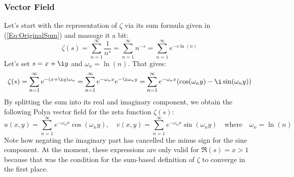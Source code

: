 \documentclass[12pt]{article}
\begin{document}
\subsubsection{Vector Field}
Let's start with the representation of $\zeta$ via its sum formula given in (\ref{Eq:OriginalSum}) and massage it a bit:
\begin{equation}
\zeta(s)
= \sum_{n=1}^{\infty} \frac{1}{n^s}
= \sum_{n=1}^{\infty} n^{-s}
= \sum_{n=1}^{\infty} e^{-s \ln(n)}
\end{equation}
Let's set $s = x + \i y$ and $\omega_n = \ln(n)$. That gives:
\begin{equation}
\zeta(s)
= \sum_{n=1}^{\infty} e^{-(x + \i y) \omega_n}
= \sum_{n=1}^{\infty} e^{-\omega_n x} e^{-\i \omega_n y}
= \sum_{n=1}^{\infty} e^{-\omega_n x} (\cos(\omega_n y) - \i \sin (\omega_n y))
\end{equation}
 By splitting the sum into its real and imaginary component, we obtain the following Polya vector field for the zeta function $\zeta(s)$:
\begin{equation}
\label{Eq:PolyaFieldOriginal}	
\boxed{
u(x,y) = \sum_{n=1}^{\infty} e^{-\omega_n x} \cos(\omega_n y), \quad
v(x,y) = \sum_{n=1}^{\infty} e^{-\omega_n x} \sin(\omega_n y) 
}
\quad \text{where} \quad \omega_n = \ln(n) 
\end{equation}
Note how negating the imaginary part has cancelled the minus sign for the sine component. At the moment, these expressions are only valid for $\Re(s) = x > 1$ because that was the condition for the sum-based definition of $\zeta$ to converge in the first place.
\end{document}
